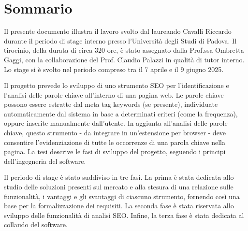 \cleardoublepage
{}
{}
\begingroup
\let\clearpage\relax
\let\cleardoublepage\relax
\let\cleardoublepage\relax

\chapter*{Sommario}

Il presente documento illustra il lavoro svolto dal laureando Cavalli Riccardo durante il periodo di stage interno presso l’Università degli Studi di Padova. Il tirocinio, della durata di circa 320 ore, è stato assegnato dalla Prof.ssa Ombretta Gaggi, con la collaborazione del Prof. Claudio Palazzi in qualità di tutor interno. Lo stage si è svolto nel periodo compreso tra il 7 aprile e il 9 giugno 2025.

\vspace{10pt}
\noindent Il progetto prevede lo sviluppo di uno strumento SEO per l’identificazione e l’analisi delle parole chiave all’interno di una pagina web. Le parole chiave possono essere estratte dal meta tag keywords (se presente), individuate automaticamente dal sistema in base a determinati criteri (come la frequenza), oppure inserite manualmente dall’utente. In aggiunta all’analisi delle parole chiave, questo strumento - da integrare in un’estensione per browser - deve consentire l’evidenziazione di tutte le occorrenze di una parola chiave nella pagina. La tesi descrive le fasi di sviluppo del progetto, seguendo i principi dell’ingegneria del software.

\vspace{10pt}
\noindent Il periodo di stage è stato suddiviso in tre fasi. La prima è stata dedicata allo studio delle soluzioni presenti sul mercato e alla stesura di una relazione sulle funzionalità, i vantaggi e gli svantaggi di ciascuno strumento, fornendo così una base per la formalizzazione dei requisiti. La seconda fase è stata riservata allo sviluppo delle funzionalità di analisi SEO. Infine, la terza fase è stata dedicata al collaudo del software.




\endgroup

\vfill
